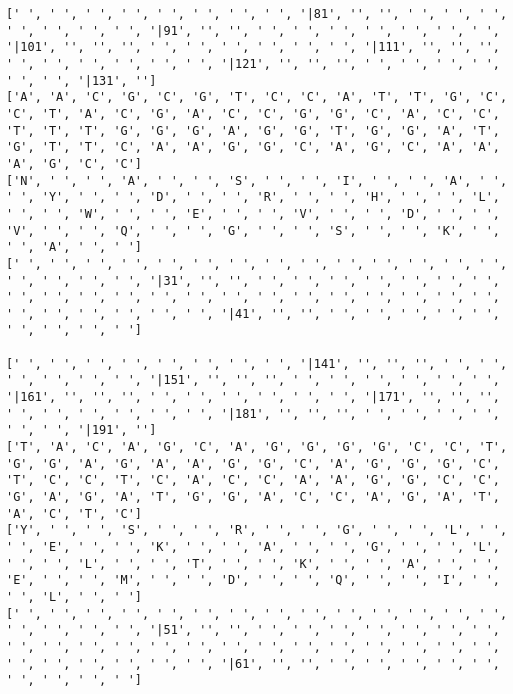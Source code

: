 \documentclass{article}
\begin{document}
\begin{Verbatim}
[' ', ' ', ' ', ' ', ' ', ' ', ' ', ' ', '|81', '', '', ' ', ' ', ' ', ' ', ' ', ' ', ' ', '|91', '', '', ' ', ' ', ' ', ' ', ' ', ' ', ' ', '|101', '', '', '', ' ', ' ', ' ', ' ', ' ', ' ', '|111', '', '', '', ' ', ' ', ' ', ' ', ' ', ' ', '|121', '', '', '', ' ', ' ', ' ', ' ', ' ', ' ', '|131', '']
['A', 'A', 'C', 'G', 'C', 'G', 'T', 'C', 'C', 'A', 'T', 'T', 'G', 'C', 'C', 'T', 'A', 'C', 'G', 'A', 'C', 'C', 'G', 'G', 'C', 'A', 'C', 'C', 'T', 'T', 'T', 'G', 'G', 'G', 'A', 'G', 'G', 'T', 'G', 'G', 'A', 'T', 'G', 'T', 'T', 'C', 'A', 'A', 'G', 'G', 'C', 'A', 'G', 'C', 'A', 'A', 'A', 'G', 'C', 'C']
['N', ' ', ' ', 'A', ' ', ' ', 'S', ' ', ' ', 'I', ' ', ' ', 'A', ' ', ' ', 'Y', ' ', ' ', 'D', ' ', ' ', 'R', ' ', ' ', 'H', ' ', ' ', 'L', ' ', ' ', 'W', ' ', ' ', 'E', ' ', ' ', 'V', ' ', ' ', 'D', ' ', ' ', 'V', ' ', ' ', 'Q', ' ', ' ', 'G', ' ', ' ', 'S', ' ', ' ', 'K', ' ', ' ', 'A', ' ', ' ']
[' ', ' ', ' ', ' ', ' ', ' ', ' ', ' ', ' ', ' ', ' ', ' ', ' ', ' ', ' ', ' ', ' ', ' ', '|31', '', '', ' ', ' ', ' ', ' ', ' ', ' ', ' ', ' ', ' ', ' ', ' ', ' ', ' ', ' ', ' ', ' ', ' ', ' ', ' ', ' ', ' ', ' ', ' ', ' ', ' ', ' ', ' ', '|41', '', '', ' ', ' ', ' ', ' ', ' ', ' ', ' ', ' ', ' ']
  
[' ', ' ', ' ', ' ', ' ', ' ', ' ', ' ', '|141', '', '', '', ' ', ' ', ' ', ' ', ' ', ' ', '|151', '', '', '', ' ', ' ', ' ', ' ', ' ', ' ', '|161', '', '', '', ' ', ' ', ' ', ' ', ' ', ' ', '|171', '', '', '', ' ', ' ', ' ', ' ', ' ', ' ', '|181', '', '', '', ' ', ' ', ' ', ' ', ' ', ' ', '|191', '']
['T', 'A', 'C', 'A', 'G', 'C', 'A', 'G', 'G', 'G', 'G', 'C', 'C', 'T', 'G', 'G', 'A', 'G', 'A', 'A', 'G', 'G', 'C', 'A', 'G', 'G', 'G', 'C', 'T', 'C', 'C', 'T', 'C', 'A', 'C', 'C', 'A', 'A', 'G', 'G', 'C', 'C', 'G', 'A', 'G', 'A', 'T', 'G', 'G', 'A', 'C', 'C', 'A', 'G', 'A', 'T', 'A', 'C', 'T', 'C']
['Y', ' ', ' ', 'S', ' ', ' ', 'R', ' ', ' ', 'G', ' ', ' ', 'L', ' ', ' ', 'E', ' ', ' ', 'K', ' ', ' ', 'A', ' ', ' ', 'G', ' ', ' ', 'L', ' ', ' ', 'L', ' ', ' ', 'T', ' ', ' ', 'K', ' ', ' ', 'A', ' ', ' ', 'E', ' ', ' ', 'M', ' ', ' ', 'D', ' ', ' ', 'Q', ' ', ' ', 'I', ' ', ' ', 'L', ' ', ' ']
[' ', ' ', ' ', ' ', ' ', ' ', ' ', ' ', ' ', ' ', ' ', ' ', ' ', ' ', ' ', ' ', ' ', ' ', '|51', '', '', ' ', ' ', ' ', ' ', ' ', ' ', ' ', ' ', ' ', ' ', ' ', ' ', ' ', ' ', ' ', ' ', ' ', ' ', ' ', ' ', ' ', ' ', ' ', ' ', ' ', ' ', ' ', '|61', '', '', ' ', ' ', ' ', ' ', ' ', ' ', ' ', ' ', ' ']
  

\end{Verbatim}
\end{document}
